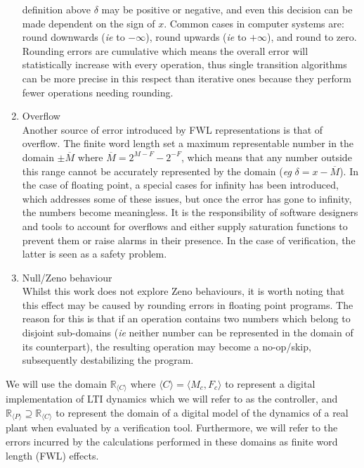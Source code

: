 \documentclass[sigconf]{llncs}
\begin{document}
\begin{enumerate}
definition above $\delta$ may be positive or negative, and even this
decision can be made dependent on the sign of $x$.  Common cases in computer
systems are: round downwards (\emph{ie} to $-\infty$), round upwards
(\emph{ie} to $+\infty$), and round to zero.  Rounding errors are cumulative
which means the overall error will statistically increase with every
operation, thus single transition algorithms can be more precise in this
respect than iterative ones because they perform fewer operations needing
rounding.
\item Overflow\\
Another source of error introduced by FWL representations is that of overflow.
The finite word length set a maximum representable number in the domain
$\pm \overline{M} \text{ where }  \overline{M}=2^{M-F}-2^{-F}$, which means that any number
outside this range cannot be accurately represented by the domain (\emph{eg} $\delta=x-\overline{M}$).
In the case of floating point, a special cases for infinity has been introduced, which addresses
some of these issues, but once the error has gone to infinity, the numbers become meaningless.
It is the responsibility of software designers and tools to account for overflows and either
supply saturation functions to prevent them or raise alarms in their presence. In the case
of verification, the latter is seen as a safety problem.
\item Null/Zeno behaviour\\
Whilst this work does not explore Zeno behaviours, it is worth noting that this
effect may be caused by rounding errors in floating point programs. The reason for this
is that if an operation contains two numbers which belong to disjoint sub-domains
(\emph{ie} neither number can be represented in the domain of its counterpart), the
resulting operation may become a no-op/skip, subsequently destabilizing the program.
\end{enumerate}

We will use the domain $\mathbb{R}_{\langle C \rangle} \text{ where } \langle C \rangle = \langle M_c,F_c \rangle$
to represent a digital implementation of LTI dynamics which we will refer to as the controller, and 
$\mathbb{R}_{\langle P \rangle} \supseteq \mathbb{R}_{\langle C \rangle}$
to represent the domain of a digital model of the dynamics of a real plant when evaluated by a verification tool.
Furthermore, we will refer to the errors incurred by the calculations performed in these domains as finite word length (FWL) effects. 

\end{document}
